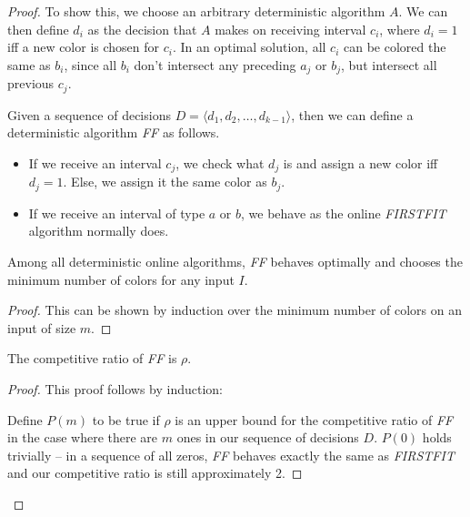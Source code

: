 \begin{proof}
To show this, we choose an arbitrary deterministic algorithm $A$. We can then define $d_i$ as the decision that $A$ makes on receiving interval $c_i$, where $d_i = 1$ iff a new color is chosen for $c_i$.  In an optimal solution, all $c_i$ can be colored the same as $b_i$, since all $b_i$ don't intersect any preceding $a_j$ or $b_j$, but intersect all previous $c_j$.

Given a sequence of decisions $D = \langle d_1, d_2, \ldots, d_{k-1} \rangle$, then we can define a deterministic algorithm \emph{FF} as follows.

\begin{itemize}
\item If we receive an interval $c_j$, we check what $d_j$ is and assign a new color iff $d_j = 1$. Else, we assign it the same color as $b_j$.

\item If we receive an interval of type $a$ or $b$, we behave as the online \emph{FIRSTFIT} algorithm normally does.
\end{itemize}

\begin{lemma} Among all deterministic online algorithms, \emph{FF} behaves optimally and chooses the minimum number of colors for any input $I$. \end{lemma}
\begin{proof}
This can be shown by induction over the minimum number of colors on an input of size $m$.
\end{proof}

\begin{lemma} The competitive ratio of \emph{FF} is $\rho$. \end{lemma}
\begin{proof}
This proof follows by induction:

Define $P(m)$ to be true if $\rho$ is an upper bound for the competitive ratio of \emph{FF} in the case where there are $m$ ones in our sequence of decisions $D$.  $P(0)$ holds trivially -- in a sequence of all zeros, \emph{FF} behaves exactly the same as \emph{FIRSTFIT} and our competitive ratio is still approximately 2.


\end{proof}
\end{proof}
